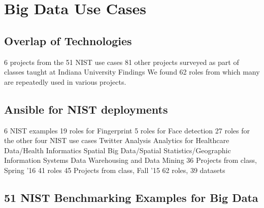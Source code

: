 \section{Big Data Use Cases}


\subsection{Overlap of Technologies}

6 projects from the 51 NIST use cases
81 other projects surveyed as part of classes taught at Indiana University
Findings
We found 62 roles from which many are repeatedly used in various projects. 

\subsection{Ansible for NIST deployments}

6 NIST examples
19 roles for Fingerprint 
5 roles for Face detection 
27 roles for the other four NIST use cases
Twitter Analysis
Analytics for Healthcare Data/Health Informatics
Spatial Big Data/Spatial Statistics/Geographic Information Systems
Data Warehousing and Data Mining
36 Projects from class, Spring '16 
41 roles
45 Projects from class, Fall '15
62 roles, 39 datasets



\subsection{51 NIST Benchmarking Examples for Big Data}


